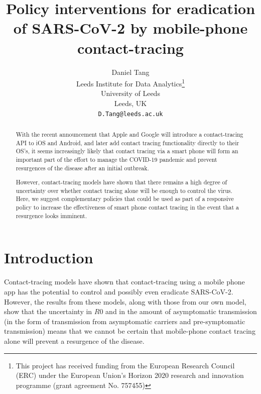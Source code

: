 \documentclass{article}
\title{Policy interventions for eradication of SARS-CoV-2 by mobile-phone contact-tracing}
\author{
  Daniel Tang\\
  Leeds Institute for Data Analytics\thanks{This project has received funding from the European Research Council (ERC) under the European Union’s Horizon 2020 research and innovation programme (grant agreement No. 757455)}\\
  University of Leeds\\
  Leeds, UK\\
  \texttt{D.Tang@leeds.ac.uk} \\
}
\begin{document}
\maketitle

\begin{abstract}
With the recent announcement\cite{applegoogle} that Apple and Google will introduce a contact-tracing API to iOS and Android, and later add contact tracing functionality directly to their OS's, it seems increasingly likely that contact tracing via a smart phone will form an important part of the effort to manage the COVID-19 pandemic and prevent resurgences of the disease after an initial outbreak.
 
However, contact-tracing models have shown \cite{Ferrettieabb6936}\cite{hellewellfeasibility} that there remains a high degree of uncertainty over whether contact tracing alone will be enough to control the virus. Here, we suggest complementary policies that could be used as part of a responsive policy to increase the effectiveness of smart phone contact tracing in the event that a resurgence looks imminent.
\end{abstract}


\section{Introduction}

Contact-tracing models\cite{Ferrettieabb6936}\cite{hellewellfeasibility} have shown that contact-tracing using a mobile phone app has the potential to control and possibly even eradicate SARS-CoV-2. However, the results from these models, along with those from our own model, show that the uncertainty in $R0$ and in the amount of asymptomatic transmission (in the form of transmission from asymptomatic carriers and pre-symptomatic transmission) means that we cannot be certain that mobile-phone contact tracing alone will prevent a resurgence of the disease.
\end{document}

